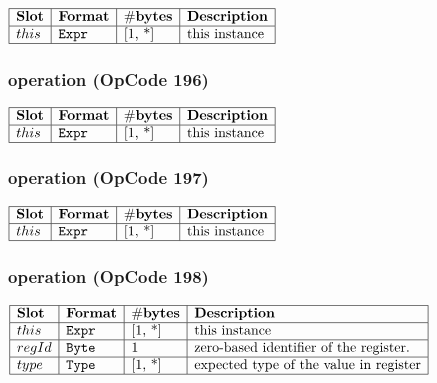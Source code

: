 \noindent
\(\begin{array}{| l | l | l | l |}
    \hline
    \bf{Slot} & \bf{Format} & \bf{\#bytes} & \bf{Description} \\
    \hline
         this & \lst{Expr} & \text{[1, *]} & \text{this instance} \\
    \hline
      
\end{array}\)
       

\subsubsection{ operation (OpCode 196)}

\noindent
\(\begin{array}{| l | l | l | l |}
    \hline
    \bf{Slot} & \bf{Format} & \bf{\#bytes} & \bf{Description} \\
    \hline
         this & \lst{Expr} & \text{[1, *]} & \text{this instance} \\
    \hline
      
\end{array}\)
       

\subsubsection{ operation (OpCode 197)}

\noindent
\(\begin{array}{| l | l | l | l |}
    \hline
    \bf{Slot} & \bf{Format} & \bf{\#bytes} & \bf{Description} \\
    \hline
         this & \lst{Expr} & \text{[1, *]} & \text{this instance} \\
    \hline
      
\end{array}\)
       

\subsubsection{ operation (OpCode 198)}

\noindent
\(\begin{array}{| l | l | l | l |}
    \hline
    \bf{Slot} & \bf{Format} & \bf{\#bytes} & \bf{Description} \\
    \hline
         this & \lst{Expr} & \text{[1, *]} & \text{this instance} \\
    \hline
           regId & \lst{Byte} & \text{1} & \text{zero-based identifier of the register.} \\
    \hline
           type & \lst{Type} & \text{[1, *]} & \text{expected type of the value in register} \\
    \hline
      
\end{array}\)
       

